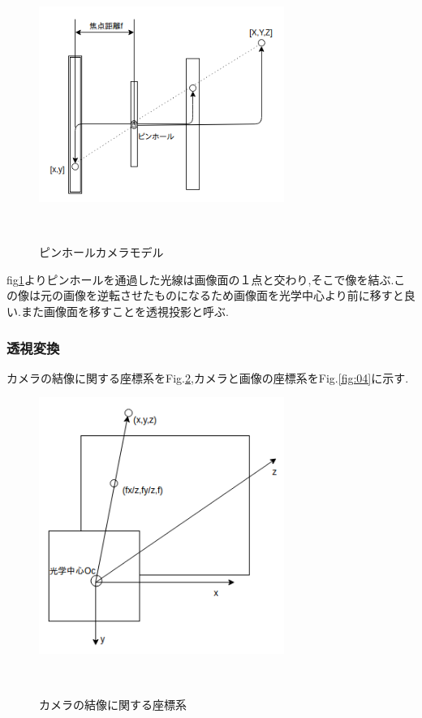 \documentclass[a4paper]{jarticle}
\begin{document}
\begin{figure}[b]
 \begin{center}
  \includegraphics[width=80mm]{image/pinhole.png}
 　\caption{ピンホールカメラモデル}%
 　\label{fig:02}%
 \end{center}
\end{figure}

fig\ref{fig:02}よりピンホールを通過した光線は画像面の１点と交わり,そこで像を結ぶ.この像は元の画像を逆転させたものになるため画像面を光学中心より前に移すと良い.また画像面を移すことを透視投影と呼ぶ.

\subsubsection{透視変換}
カメラの結像に関する座標系をFig.\ref{fig:03},カメラと画像の座標系をFig.\ref{fig:04}に示す.

\begin{figure}[b]
 \begin{center}
  \includegraphics[width=80mm]{image/camera1.png}
 　\caption{カメラの結像に関する座標系}%
 　\label{fig:03}%
 \end{center}
\end{figure}
\end{document}
